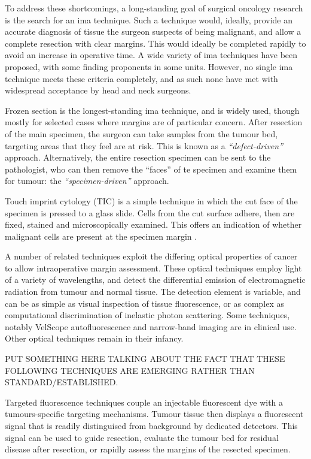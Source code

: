 To address these shortcomings, a long-standing goal of surgical oncology research is the search for an \gls{ima}  technique.
Such a technique would, ideally, provide an accurate diagnosis of tissue the surgeon suspects of being malignant, and allow a complete resection with clear margins.
This would ideally be completed rapidly to avoid an increase in operative time.
A wide variety of \gls{ima} techniques have been proposed, with some finding proponents in some units.
However, no single \gls{ima} technique meets these criteria completely, and as such none have met with widespread acceptance by head and neck surgeons.

Frozen section is the longest-standing \gls{ima} technique, and is widely used, though mostly for selected cases where margins are of particular concern.
After resection of the main specimen, the surgeon can take samples from the tumour bed, targeting  areas that they feel are at risk.
This is known as a \emph{``defect-driven''} approach.
Alternatively, the entire resection specimen can be sent to the pathologist, who can then remove the ``faces'' of te specimen and examine them for tumour: the \emph{``specimen-driven''} approach.

Touch imprint cytology (TIC) is a simple technique in which the cut face of the specimen is pressed to a glass slide. 
Cells from the cut surface adhere, then are fixed, stained and microscopically examined. 
This offers an indication of whether malignant cells are present at the specimen margin \cite{naveedDiagnosticAccuracyTouch2017}.

A number of related techniques exploit the differing optical properties of cancer to allow intraoperative margin assessment.
These optical techniques employ light of a variety of wavelengths, and detect the differential emission of electromagnetic radiation from tumour and normal tissue. 
The detection element is variable, and can be as simple as visual inspection of tissue fluorescence, or as complex as computational discrimination of inelastic photon scattering.
Some techniques, notably VelScope autofluorescence and narrow-band imaging are in clinical use.
Other optical techniques remain in their infancy.

PUT SOMETHING HERE TALKING ABOUT THE FACT THAT THESE FOLLOWING TECHNIQUES ARE EMERGING RATHER THAN STANDARD/ESTABLISHED.

Targeted fluorescence techniques couple an injectable fluorescent dye with a tumours-specific targeting mechanisms.
Tumour tissue then displays a fluorescent signal that is readily distinguised from background by dedicated detectors.
This signal can be used to guide resection, evaluate the tumour bed for residual disease after resection, or rapidly assess the margins of the resected specimen.

